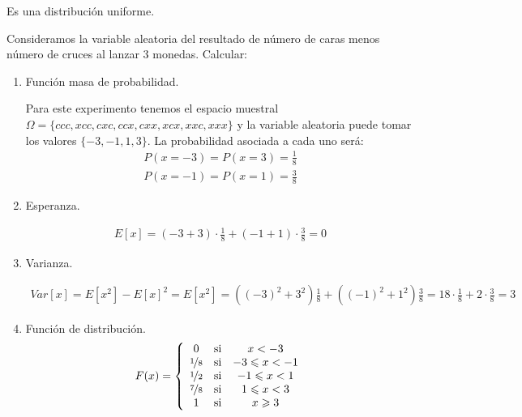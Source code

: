 \begin{ejercicio}
\begin{enumerate}[label=\alph*)]
        Es una distribución uniforme.
    \end{enumerate} 
\end{ejercicio}

\begin{ejercicio} Consideramos la variable aleatoria del resultado de número de caras menos número de cruces al lanzar 3 monedas. Calcular:
    
    \begin{enumerate}
        \item Función masa de probabilidad.
        
        Para este experimento tenemos el espacio muestral $\Omega=\{ccc, xcc, cxc, ccx, cxx, xcx, xxc, xxx\}$ y la variable aleatoria puede tomar los valores  $\{-3, -1, 1, 3\}$. La probabilidad asociada a cada uno será:
        \begin{gather*}
            P(x=-3) = P(x=3) = \frac{1}{8}\\
            P(x=-1) = P(x=1) = \frac{3}{8}
        \end{gather*}

        \item Esperanza.
        
        \begin{gather*}
            E[x] = (-3+3) \cdot \frac{1}{8} + (-1+1) \cdot \frac{3}{8} = 0
        \end{gather*}

        \item Varianza.

        \begin{gather*}
            Var[x] = E[x^2]-E[x]^2 = E[x^2] = ((-3)^2 + 3^2) \frac{1}{8} + ((-1)^2+1^2) \frac{3}{8} = 18 \cdot \frac{1}{8} + 2 \cdot \frac{3}{8} = 3
        \end{gather*}

        \item Función de distribución.
        \begin{gather*}
            F(x)=\left\{
            \begin{array}{ccc}
                0 & \text{si} & x<-3\\
                \nicefrac{1}{8}& \text{si} & -3 \leq x < -1 \\
                \nicefrac{1}{2}& \text{si} & -1 \leq x < 1 \\
                \nicefrac{7}{8}& \text{si} & 1 \leq x < 3 \\
                1& \text{si} & x \geq 3
            \end{array}
            \right.
        \end{gather*}
    \end{enumerate}
\end{ejercicio}

